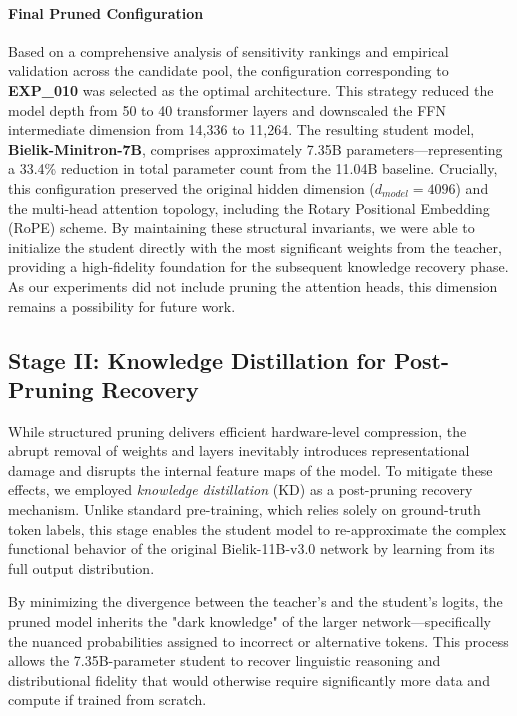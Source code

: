 \documentclass{article}
\begin{document}
\paragraph{Final Pruned Configuration}
Based on a comprehensive analysis of sensitivity rankings and empirical validation across the candidate pool, the configuration corresponding to \textbf{EXP\_010} was selected as the optimal architecture. This strategy reduced the model depth from 50 to 40 transformer layers and downscaled the FFN intermediate dimension from 14,336 to 11,264. The resulting student model, \textbf{Bielik-Minitron-7B}, comprises approximately 7.35B parameters—representing a 33.4\% reduction in total parameter count from the 11.04B baseline. Crucially, this configuration preserved the original hidden dimension ($d_{model} = 4096$) and the multi-head attention topology, including the Rotary Positional Embedding (RoPE) scheme. By maintaining these structural invariants, we were able to initialize the student directly with the most significant weights from the teacher, providing a high-fidelity foundation for the subsequent knowledge recovery phase. As our experiments did not include pruning the attention heads, this dimension remains a possibility for future work.

\subsection{Stage II: Knowledge Distillation for Post-Pruning Recovery}

While structured pruning delivers efficient hardware-level compression, the abrupt removal of weights and layers inevitably introduces representational damage and disrupts the internal feature maps of the model. To mitigate these effects, we employed \emph{knowledge distillation} (KD) as a post-pruning recovery mechanism. Unlike standard pre-training, which relies solely on ground-truth token labels, this stage enables the student model to re-approximate the complex functional behavior of the original Bielik-11B-v3.0 network by learning from its full output distribution.

By minimizing the divergence between the teacher's and the student's logits, the pruned model inherits the "dark knowledge" of the larger network—specifically the nuanced probabilities assigned to incorrect or alternative tokens. This process allows the 7.35B-parameter student to recover linguistic reasoning and distributional fidelity that would otherwise require significantly more data and compute if trained from scratch.
\end{document}
